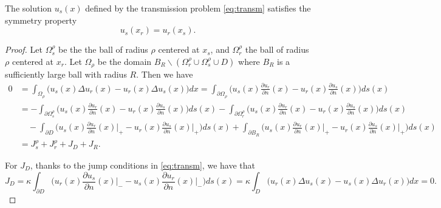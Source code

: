 \begin{proposition} The solution $u_s(x)$ defined by the transmission problem \eqref{eq:transm}
satisfies the symmetry property
\begin{equation}
u_s(x_r) = u_r(x_s). \label{eq:Vsym}
\end{equation}
\end{proposition}
\begin{proof} Let $\Omega^\rho_s$ be the the ball of radius $\rho$
centered at $x_s$, and $\Omega^\rho_r$ the ball of radius $\rho$
centered at $x_r$. Let $\Omega_\rho$ be the domain $B_R
\backslash(\Omega^\rho_r \cup \Omega^\rho_s \cup D)$ where $B_R$
is a sufficiently large ball with radius $R$. Then we have
\begin{equation*}
\begin{aligned}
0 &= \int_{\Omega_\rho} \bigg(u_s(x) \Delta u_r(x) - u_r(x) \Delta
u_s(x)\bigg) dx = \int_{\partial \Omega_\rho} \bigg( u_s(x)
\frac{\partial u_r}{\partial n} (x) - u_r(x) \frac{\partial
u_s}{\partial n} (x)
\bigg) ds(x)\\
&= -\int_{\partial \Omega^\rho_s} \bigg( u_s(x) \frac{\partial
u_r}{\partial n} (x) - u_r(x) \frac{\partial u_s}{\partial n} (x)
\bigg) ds(x) - \int_{\partial \Omega^\rho_r} \bigg( u_s(x)
\frac{\partial u_r}{\partial n} (x) - u_r(x) \frac{\partial
u_s}{\partial n} (x) \bigg)
 ds(x)\\
 & \quad - \int_{\partial D} \bigg( u_s(x) \frac{\partial u_r}{\partial n}
(x)\Big|_+ - u_r(x) \frac{\partial u_s}{\partial n} (x)\Big|_+
\bigg) ds(x) + \int_{\partial B_R}\bigg(  u_s(x) \frac{\partial
u_r}{\partial n} (x)\Big|_+ -
u_r(x) \frac{\partial u_s}{\partial n} (x)\Big|_+ \bigg) ds(x)\\
 &= J^\rho_s + J^\rho_r + J_D + J_R.
\end{aligned}
\end{equation*}

For $J_D$, thanks to the jump conditions in \eqref{eq:transm}, we
have that
\begin{equation*}
J_D = \kappa \int_{\partial D} \bigg( u_r(x) \frac{\partial
u_s}{\partial n} (x)\Big|_-  - u_s(x) \frac{\partial u_r}{\partial
n} (x)\Big|_- \bigg) ds(x) = \kappa \int_D  \bigg( u_r(x) \Delta
u_s(x) - u_s(x) \Delta u_r(x) \bigg) dx = 0.
\end{equation*}


\end{proof}
